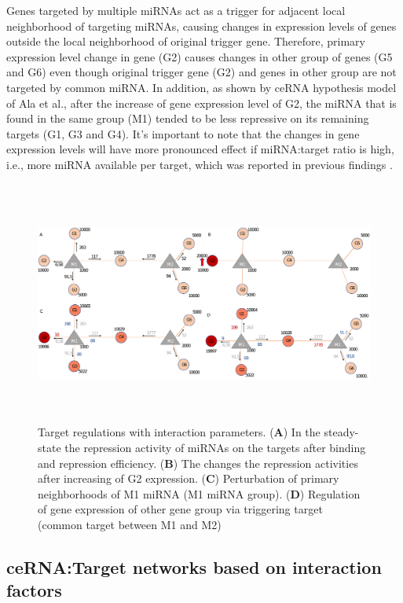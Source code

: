 \documentclass[a4,center,fleqn]{NAR}
\begin{document}
Genes targeted by multiple miRNAs act as a trigger for adjacent local
neighborhood of targeting miRNAs, causing changes in expression levels
of genes outside the local neighborhood of original trigger gene.
Therefore, primary expression level change in gene (G2) causes changes
in other group of genes (G5 and G6) even though original trigger gene
(G2) and genes in other group are not targeted by common miRNA. In
addition, as shown by ceRNA hypothesis model of Ala et al., after the
increase of gene expression level of G2, the miRNA that is found in the
same group (M1) tended to be less repressive on its remaining targets
(G1, G3 and G4). It's important to note that the changes in gene
expression levels will have more pronounced effect if miRNA:target ratio
is high, i.e., more miRNA available per target, which was reported in
previous findings
\citep{arvey_target_2010, bosson_endogenous_2014, denzler_assessing_2014}.

\begin{figure}[ht]
\begin{center}
\includegraphics[width=15cm,height=8cm]{fig3_new.eps}
\end{center}
\caption{Target regulations with interaction parameters. 
     (\textbf{A}) In the steady-state the repression activity of miRNAs on the targets after binding and repression efficiency. 
     (\textbf{B}) The changes the repression activities after increasing of G2 expression. 
     (\textbf{C}) Perturbation of primary neighborhoods of M1 miRNA (M1 miRNA group). 
     (\textbf{D}) Regulation of gene expression of other gene group via triggering target (common target between M1 and M2)}
\label{fig:fig3}
\end{figure}

\subsection{ceRNA:Target networks based on interaction factors}
\end{document}
